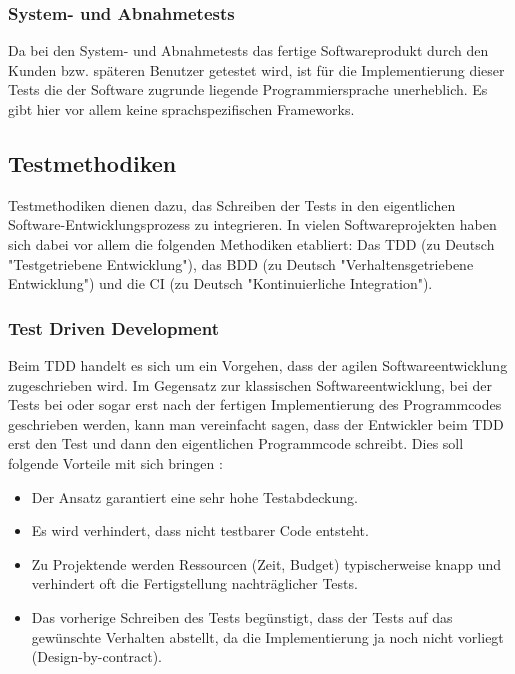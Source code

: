 \subsubsection{System- und Abnahmetests}

Da bei den System- und Abnahmetests das fertige Softwareprodukt durch den Kunden bzw. späteren Benutzer getestet wird, ist für die Implementierung dieser Tests die der Software zugrunde liegende Programmiersprache unerheblich. Es gibt hier vor allem keine sprachspezifischen Frameworks.

\subsection{Testmethodiken}

Testmethodiken dienen dazu, das Schreiben der Tests in den eigentlichen Software-Entwicklungsprozess zu integrieren. In vielen Softwareprojekten haben sich dabei vor allem die folgenden Methodiken etabliert: Das \ac{TDD} (zu Deutsch "Testgetriebene Entwicklung"), das \ac{BDD} (zu Deutsch "Verhaltensgetriebene Entwicklung") und die \ac{CI} (zu Deutsch "Kontinuierliche Integration").

\subsubsection{Test Driven Development}

Beim \ac{TDD} handelt es sich um ein Vorgehen, dass der agilen Softwareentwicklung zugeschrieben wird. Im Gegensatz zur klassischen Softwareentwicklung, bei der Tests bei oder sogar erst nach der fertigen Implementierung des Programmcodes geschrieben werden, kann man vereinfacht sagen, dass der Entwickler beim \ac{TDD} erst den Test und dann den eigentlichen Programmcode schreibt. Dies soll folgende Vorteile mit sich bringen \citep[Vgl.][]{Wiki13-05}:

\begin{itemize}
  \item Der Ansatz garantiert eine sehr hohe Testabdeckung.
  \item Es wird verhindert, dass nicht testbarer Code entsteht.
  \item Zu Projektende werden Ressourcen (Zeit, Budget) typischerweise knapp und verhindert oft die Fertigstellung nachträglicher Tests.
  \item Das vorherige Schreiben des Tests begünstigt, dass der Tests auf das gewünschte Verhalten abstellt, da die Implementierung ja noch nicht vorliegt (Design-by-contract).
\end{itemize}

